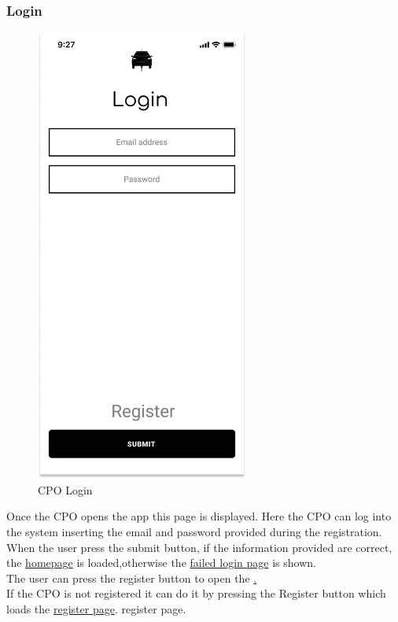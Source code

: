 \subsubsection{Login}
\begin{figure}[H]
    \centering
    \includegraphics[keepaspectratio, height=15cm]{Mockup/CPOAppInterface/Login.png}
    \caption{\ac{CPO} Login}
    \label{site:Login}
\end{figure}
Once the \ac{CPO} opens the app this page is displayed. Here the \ac{CPO} can log into the system inserting the email and password provided during the registration. When the user press the submit button, if the information provided are correct, the \hyperref[site:Homepage]{homepage} is loaded,otherwise the \hyperref[site:FailedLogin]{failed login page} is shown.\\
The user can press the register button to open the \hyperref[fig:Register].\\
If the \ac{CPO} is not registered it can do it by pressing the Register button which loads the \hyperref[site:Register]{register page}.
{register page}.
